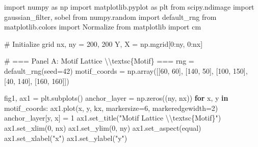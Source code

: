 \documentclass[
  11pt,
]{article}
\newenvironment{Shaded}{\begin{snugshade}}{\end{snugshade}}
\newcommand{\CharTok}[1]{\textcolor[rgb]{0.13,0.47,0.30}{#1}}
\newcommand{\CommentTok}[1]{\textcolor[rgb]{0.37,0.37,0.37}{#1}}
\newcommand{\ControlFlowTok}[1]{\textcolor[rgb]{0.00,0.23,0.31}{\textbf{#1}}}
\newcommand{\DecValTok}[1]{\textcolor[rgb]{0.68,0.00,0.00}{#1}}
\newcommand{\ImportTok}[1]{\textcolor[rgb]{0.00,0.46,0.62}{#1}}
\newcommand{\KeywordTok}[1]{\textcolor[rgb]{0.00,0.23,0.31}{\textbf{#1}}}
\newcommand{\NormalTok}[1]{\textcolor[rgb]{0.00,0.23,0.31}{#1}}
\newcommand{\OperatorTok}[1]{\textcolor[rgb]{0.37,0.37,0.37}{#1}}
\newcommand{\SpecialCharTok}[1]{\textcolor[rgb]{0.37,0.37,0.37}{#1}}
\newcommand{\StringTok}[1]{\textcolor[rgb]{0.13,0.47,0.30}{#1}}
\begin{document}
\begin{Shaded}
\begin{Highlighting}[]
\ImportTok{import}\NormalTok{ numpy }\ImportTok{as}\NormalTok{ np}
\ImportTok{import}\NormalTok{ matplotlib.pyplot }\ImportTok{as}\NormalTok{ plt}
\ImportTok{from}\NormalTok{ scipy.ndimage }\ImportTok{import}\NormalTok{ gaussian\_filter, sobel}
\ImportTok{from}\NormalTok{ numpy.random }\ImportTok{import}\NormalTok{ default\_rng}
\ImportTok{from}\NormalTok{ matplotlib.colors }\ImportTok{import}\NormalTok{ Normalize}
\ImportTok{from}\NormalTok{ matplotlib }\ImportTok{import}\NormalTok{ cm}

\CommentTok{\# Initialize grid}
\NormalTok{nx, ny }\OperatorTok{=} \DecValTok{200}\NormalTok{, }\DecValTok{200}
\NormalTok{Y, X }\OperatorTok{=}\NormalTok{ np.mgrid[}\DecValTok{0}\NormalTok{:ny, }\DecValTok{0}\NormalTok{:nx]}

\CommentTok{\# === Panel A: Motif Lattice \textbackslash{}\textbackslash{}textsc\{Motif\} ===}
\NormalTok{rng }\OperatorTok{=}\NormalTok{ default\_rng(seed}\OperatorTok{=}\DecValTok{42}\NormalTok{)}
\NormalTok{motif\_coords }\OperatorTok{=}\NormalTok{ np.array([[}\DecValTok{60}\NormalTok{, }\DecValTok{60}\NormalTok{], [}\DecValTok{140}\NormalTok{, }\DecValTok{50}\NormalTok{], [}\DecValTok{100}\NormalTok{, }\DecValTok{150}\NormalTok{], [}\DecValTok{40}\NormalTok{, }\DecValTok{140}\NormalTok{], [}\DecValTok{160}\NormalTok{, }\DecValTok{160}\NormalTok{]])}

\NormalTok{fig1, ax1 }\OperatorTok{=}\NormalTok{ plt.subplots()}
\NormalTok{anchor\_layer }\OperatorTok{=}\NormalTok{ np.zeros((ny, nx))}
\ControlFlowTok{for}\NormalTok{ x, y }\KeywordTok{in}\NormalTok{ motif\_coords:}
\NormalTok{    ax1.plot(x, y, }\StringTok{\textquotesingle{}kx\textquotesingle{}}\NormalTok{, markersize}\OperatorTok{=}\DecValTok{6}\NormalTok{, markeredgewidth}\OperatorTok{=}\DecValTok{2}\NormalTok{)}
\NormalTok{    anchor\_layer[y, x] }\OperatorTok{=} \DecValTok{1}
\NormalTok{ax1.set\_title(}\StringTok{"Motif Lattice }\CharTok{\textbackslash{}\textbackslash{}}\StringTok{textsc}\SpecialCharTok{\{Motif\}}\StringTok{"}\NormalTok{)}
\NormalTok{ax1.set\_xlim(}\DecValTok{0}\NormalTok{, nx)}
\NormalTok{ax1.set\_ylim(}\DecValTok{0}\NormalTok{, ny)}
\NormalTok{ax1.set\_aspect(}\StringTok{\textquotesingle{}equal\textquotesingle{}}\NormalTok{)}
\NormalTok{ax1.set\_xlabel(}\StringTok{"x"}\NormalTok{)}
\NormalTok{ax1.set\_ylabel(}\StringTok{"y"}\NormalTok{)}


\end{Highlighting}
\end{Shaded}
\end{document}
